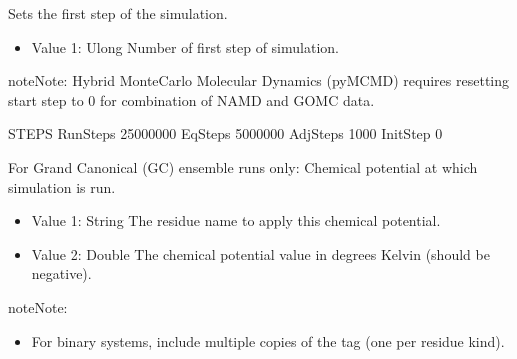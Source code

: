 \documentclass[letterpaper,10pt,english]{sphinxmanual}
\begin{document}
\begin{description}
\begin{itemize}
\end{itemize}

\item[{\sphinxcode{\sphinxupquote{InitStep}}}] \leavevmode
\sphinxAtStartPar
Sets the first step of the simulation.
\begin{itemize}
\item {} 
\sphinxAtStartPar
Value 1: Ulong \sphinxhyphen{} Number of first step of simulation.

\end{itemize}

\begin{sphinxadmonition}{note}{Note:}
\sphinxAtStartPar
Hybrid Monte\sphinxhyphen{}Carlo Molecular Dynamics (py\sphinxhyphen{}MCMD) requires resetting start step to 0 for combination of NAMD and GOMC data.

\begin{sphinxVerbatim}[commandchars=\\\{\}]
\PYGZsh{}\PYGZsh{}\PYGZsh{}\PYGZsh{}\PYGZsh{}\PYGZsh{}\PYGZsh{}\PYGZsh{}\PYGZsh{}\PYGZsh{}\PYGZsh{}\PYGZsh{}\PYGZsh{}\PYGZsh{}\PYGZsh{}\PYGZsh{}\PYGZsh{}\PYGZsh{}\PYGZsh{}\PYGZsh{}\PYGZsh{}\PYGZsh{}\PYGZsh{}\PYGZsh{}\PYGZsh{}\PYGZsh{}\PYGZsh{}\PYGZsh{}\PYGZsh{}\PYGZsh{}\PYGZsh{}\PYGZsh{}\PYGZsh{}
\PYGZsh{} STEPS
\PYGZsh{}\PYGZsh{}\PYGZsh{}\PYGZsh{}\PYGZsh{}\PYGZsh{}\PYGZsh{}\PYGZsh{}\PYGZsh{}\PYGZsh{}\PYGZsh{}\PYGZsh{}\PYGZsh{}\PYGZsh{}\PYGZsh{}\PYGZsh{}\PYGZsh{}\PYGZsh{}\PYGZsh{}\PYGZsh{}\PYGZsh{}\PYGZsh{}\PYGZsh{}\PYGZsh{}\PYGZsh{}\PYGZsh{}\PYGZsh{}\PYGZsh{}\PYGZsh{}\PYGZsh{}\PYGZsh{}\PYGZsh{}\PYGZsh{}
RunSteps    25000000
EqSteps     5000000
AdjSteps    1000
InitStep    0
\end{sphinxVerbatim}
\end{sphinxadmonition}

\item[{\sphinxcode{\sphinxupquote{ChemPot}}}] \leavevmode
\sphinxAtStartPar
For Grand Canonical (GC) ensemble runs only: Chemical potential at which simulation is run.
\begin{itemize}
\item {} 
\sphinxAtStartPar
Value 1: String \sphinxhyphen{} The residue name to apply this chemical potential.

\item {} 
\sphinxAtStartPar
Value 2: Double \sphinxhyphen{} The chemical potential value in degrees Kelvin (should be negative).

\end{itemize}

\begin{sphinxadmonition}{note}{Note:}\begin{itemize}
\item {} 
\sphinxAtStartPar
For binary systems, include multiple copies of the tag (one per residue kind).


\end{itemize}
\end{sphinxadmonition}
\end{description}
\end{document}
